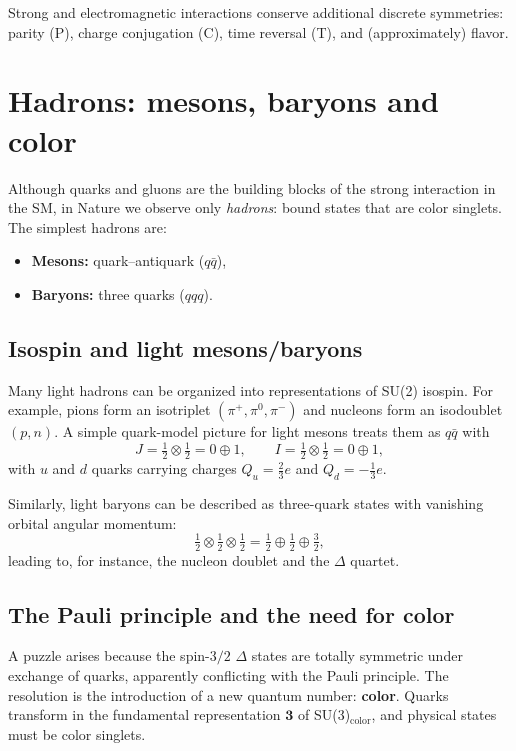 Strong and electromagnetic interactions conserve additional discrete symmetries:
parity (P), charge conjugation (C), time reversal (T), and (approximately) flavor.

\section{Hadrons: mesons, baryons and color}
Although quarks and gluons are the building blocks of the strong interaction in the SM,
in Nature we observe only \emph{hadrons}: bound states that are color singlets.
The simplest hadrons are:
\begin{itemize}
  \item \textbf{Mesons:} quark--antiquark ($q\bar q$),
  \item \textbf{Baryons:} three quarks ($qqq$).
\end{itemize}

\subsection{Isospin and light mesons/baryons}
Many light hadrons can be organized into representations of SU(2) isospin.
For example, pions form an isotriplet $(\pi^+,\pi^0,\pi^-)$ and nucleons form an isodoublet $(p,n)$.
A simple quark-model picture for light mesons treats them as $q\bar q$ with
\begin{equation}
J=\tfrac{1}{2}\otimes \tfrac{1}{2}=0\oplus 1,\qquad
I=\tfrac{1}{2}\otimes \tfrac{1}{2}=0\oplus 1,
\end{equation}
with $u$ and $d$ quarks carrying charges $Q_u=\tfrac{2}{3}e$ and $Q_d=-\tfrac{1}{3}e$.

Similarly, light baryons can be described as three-quark states with vanishing orbital
angular momentum:
\begin{equation}
\tfrac{1}{2}\otimes \tfrac{1}{2}\otimes \tfrac{1}{2}
= \tfrac{1}{2}\oplus \tfrac{1}{2}\oplus \tfrac{3}{2},
\end{equation}
leading to, for instance, the nucleon doublet and the $\Delta$ quartet.

\subsection{The Pauli principle and the need for color}
A puzzle arises because the spin-$3/2$ $\Delta$ states are totally symmetric under
exchange of quarks, apparently conflicting with the Pauli principle.
The resolution is the introduction of a new quantum number: \textbf{color}.
Quarks transform in the fundamental representation $\mathbf{3}$ of SU(3)$_\text{color}$, and
physical states must be color singlets.

